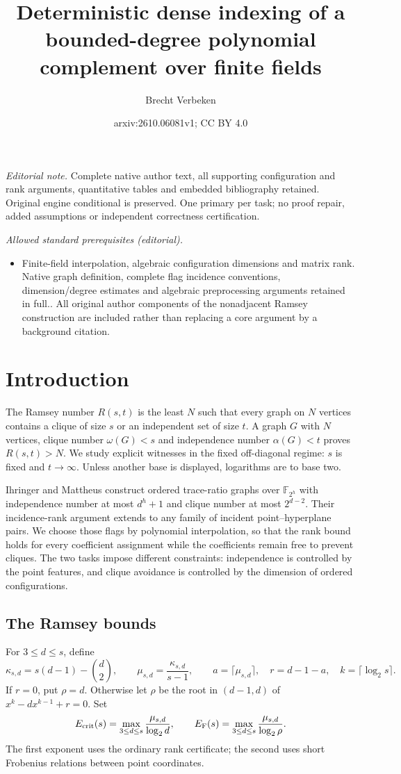 \documentclass[11pt,a4paper]{article}
\title{Deterministic dense indexing of a bounded-degree polynomial complement over finite fields}
\author{Brecht Verbeken}
\date{arxiv:2610.06081v1; CC BY 4.0}
\newcommand{\F}{\mathbb F}
\theoremstyle{definition}
\theoremstyle{remark}
\numberwithin{equation}{section}
\begin{document}
\maketitle
\noindent\textit{Editorial note.} Complete native author text, all supporting configuration and rank arguments, quantitative tables and embedded bibliography retained. Original engine conditional is preserved. One primary per task; no proof repair, added assumptions or independent correctness certification.\par\medskip
\noindent\textit{Allowed standard prerequisites (editorial).}\begin{itemize}
\item Finite-field interpolation, algebraic configuration dimensions and matrix rank. Native graph definition, complete flag incidence conventions, dimension/degree estimates and algebraic preprocessing arguments retained in full.. All original author components of the nonadjacent Ramsey construction are included rather than replacing a core argument by a background citation.
\end{itemize}\medskip
\section{Introduction}\label{sec:intro}
The Ramsey number $R(s,t)$ is the least $N$ such that every graph on $N$ vertices contains a clique of size $s$ or an independent set of size $t$. A graph $G$ with $N$ vertices, clique number $\omega(G)<s$ and independence number $\alpha(G)<t$ proves $R(s,t)>N$. We study explicit witnesses in the fixed off-diagonal regime: $s$ is fixed and $t\to\infty$. Unless another base is displayed, logarithms are to base two.

Ihringer and Mattheus \cite{IM} construct ordered trace-ratio graphs over $\F_{2^h}$ with independence number at most $d^h+1$ and clique number at most $2^{d-2}$. Their incidence-rank argument extends to any family of incident point--hyperplane pairs. We choose those flags by polynomial interpolation, so that the rank bound holds for every coefficient assignment while the coefficients remain free to prevent cliques. The two tasks impose different constraints: independence is controlled by the point features, and clique avoidance is controlled by the dimension of ordered configurations.

\subsection{The Ramsey bounds}
For $3\le d\le s$, define
\[
\kappa_{s,d}=s(d-1)-\binom d2,\qquad
\mu_{s,d}=\frac{\kappa_{s,d}}{s-1},\qquad
a=\lceil\mu_{s,d}\rceil,\quad r=d-1-a,\quad k=\lceil\log_2s\rceil.
\]
If $r=0$, put $\rho=d$. Otherwise let $\rho$ be the root in $(d-1,d)$ of $x^k-dx^{k-1}+r=0$. Set
\[
E_{\rm crit}(s)=\max_{3\le d\le s}\frac{\mu_{s,d}}{\log_2d},\qquad
E_{\rm F}(s)=\max_{3\le d\le s}\frac{\mu_{s,d}}{\log_2\rho}.
\]
The first exponent uses the ordinary rank certificate; the second uses short Frobenius relations between point coordinates.
\end{document}
